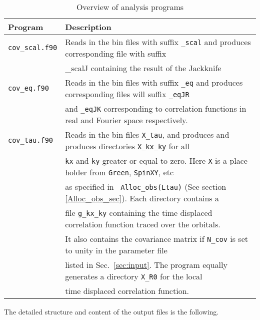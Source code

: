 \begin{table}[h]
   \begin{tabular}{l l}
   Program & Description \\\hline
   \texttt{cov\_scal.f90}  &  Reads in the bin files with suffix \texttt{\_scal}  and produces  corresponding file with suffix  \\ 
                                     &   {\_scalJ}  containing the  result of the Jackknife  \\
   \texttt{cov\_eq.f90}    &   Reads in the bin files with suffix \texttt{\_eq}  and produces  corresponding files will suffix  \texttt{\_eqJR}  \\
                                     &   and  \texttt{\_eqJK}   corresponding to correlation functions in real and Fourier space respectively.  \\
   \texttt{cov\_tau.f90}   &   Reads in the bin files  \texttt{X\_tau}, and produces   and produces directories  \texttt{X\_kx\_ky}   for all  \\
                                     &   \texttt{kx} and \texttt{ky} greater or equal to zero.   Here \texttt{X}  is a place holder from \texttt{Green}, \texttt{SpinXY}, etc  \\
                                     &  as specified in \texttt{ Alloc\_obs(Ltau)} (See section \ref{Alloc_obs_sec}).  Each directory contains  a \\ 
                                     &   file    \texttt{g\_kx\_ky}    containing the  time displaced correlation function traced over the  orbitals.  \\ 
                                     &  It also contains the  covariance matrix if \texttt{N\_cov} is set to unity in the parameter file  \\
                                     &  listed in Sec.~\ref{sec:input}.  The program equally generates a directory  \texttt{X\_R0}  for the local \\
                                     &  time displaced  correlation function.  
                                     
    \end{tabular}
   \caption{ Overview of analysis programs \label{table:analysis_programs}}
\end{table}

The  detailed structure and content of the  output files is the following.  